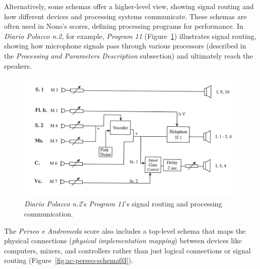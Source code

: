 Alternatively, some schemas offer a higher-level view, showing signal routing and how different devices and processing systems communicate. These schemas are often used in Nono's scores, defining processing programs for performance. In \textit{Diario Polacco n.2}, for example, \textit{Program 11} (Figure~\ref{fig:ac-nono-schema01}) illustrates signal routing, showing how microphone signals pass through various processors (described in the \textit{Processing and Parameters Description} subsection) and ultimately reach the speakers.

\begin{figure}[!h]
    \centering
    \includegraphics[width=\linewidth]{chapters/appendix/c/image/figc-nono-schema01.png}
    \caption{\textit{Diario Polacco n.2}'s \textit{Program 11}’s signal routing and processing communication.}
    \label{fig:ac-nono-schema01}
\end{figure}

The \textit{Perseo e Andromeda} score also includes a top-level schema that maps the physical connections (\textit{physical implementation mapping}) between devices like computers, mixers, and controllers rather than just logical connections or signal routing (Figure~\ref{fig:ac-perseo-schema03}).

